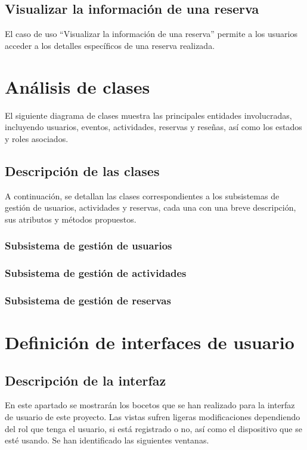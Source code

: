 \subsection{Visualizar la información de una reserva}
El caso de uso “Visualizar la información de una reserva” permite a los usuarios acceder a los detalles específicos de una reserva realizada.

\section{Análisis de clases}
El siguiente diagrama de clases muestra las principales entidades involucradas, incluyendo usuarios, eventos, actividades, reservas y reseñas, así como los estados y roles asociados.

\subsection{Descripción de las clases}
A continuación, se detallan las clases correspondientes a los subsistemas de gestión de usuarios, actividades y reservas, cada una con una breve descripción, sus atributos y métodos propuestos.
\subsubsection{Subsistema de gestión de usuarios}

\subsubsection{Subsistema de gestión de actividades}

\subsubsection{Subsistema de gestión de reservas}

\section{Definición de interfaces de usuario}
\subsection{Descripción de la interfaz }
En este apartado se mostrarán los bocetos que se han realizado para la interfaz de usuario de este proyecto. Las vistas sufren ligeras modificaciones dependiendo del rol que tenga el usuario, si está registrado o no, así como el dispositivo que se esté usando. Se han identificado las siguientes ventanas.
